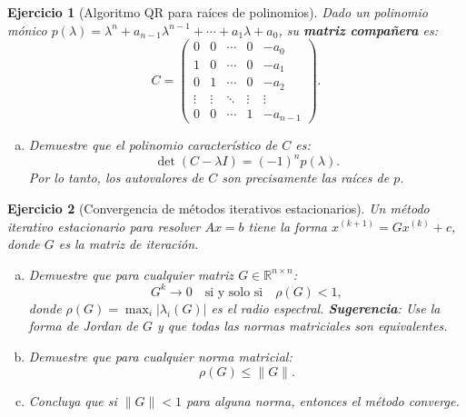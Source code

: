 \documentclass[12pt]{article}
\newtheorem{exercise}{Ejercicio}
\begin{document}
\begin{exercise}[Algoritmo QR para raíces de polinomios]
Dado un polinomio mónico $p(\lambda) = \lambda^n + a_{n-1}\lambda^{n-1} + \cdots + a_1\lambda + a_0$, su \textbf{matriz compañera} es:
\[
C = \begin{pmatrix}
0 & 0 & \cdots & 0 & -a_0 \\
1 & 0 & \cdots & 0 & -a_1 \\
0 & 1 & \cdots & 0 & -a_2 \\
\vdots & \vdots & \ddots & \vdots & \vdots \\
0 & 0 & \cdots & 1 & -a_{n-1}
\end{pmatrix}.
\]
\begin{enumerate}[(a)]
\item Demuestre que el polinomio característico de $C$ es:
\[
\det(C - \lambda I) = (-1)^n p(\lambda).
\]
Por lo tanto, los autovalores de $C$ son precisamente las raíces de $p$.
\end{enumerate}
\end{exercise}


\begin{exercise}[Convergencia de métodos iterativos estacionarios]
Un método iterativo estacionario para resolver $Ax = b$ tiene la forma $x^{(k+1)} = Gx^{(k)} + c$, donde $G$ es la matriz de iteración.
\begin{enumerate}[(a)]
\item Demuestre que para cualquier matriz $G \in \mathbb{R}^{n \times n}$:
\[
G^k \to 0 \quad \text{si y solo si} \quad \rho(G) < 1,
\]
donde $\rho(G) = \max_i |\lambda_i(G)|$ es el radio espectral.
\textbf{Sugerencia}: Use la forma de Jordan de $G$ y que todas las normas matriciales son equivalentes.
\item Demuestre que para cualquier norma matricial:
\[
\rho(G) \leq \|G\|.
\]
\item Concluya que si $\|G\| < 1$ para alguna norma, entonces el método converge.
\end{enumerate}
\end{exercise}
\end{document}
